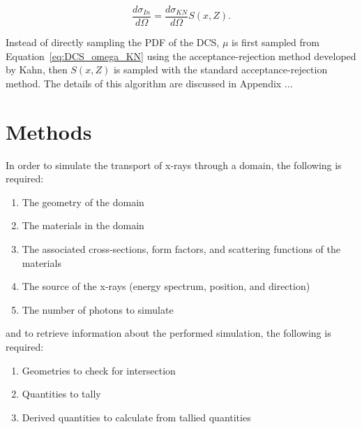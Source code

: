 \begin{equation}
    \frac{d\sigma_{In}}{d\Omega} = \frac{d\sigma_{KN}}{d\Omega} S(x, Z).
\end{equation}

\par Instead of directly sampling the PDF of the DCS, $\mu$ is first sampled from Equation~\ref{eq:DCS_omega_KN} using the acceptance-rejection method developed by Kahn, then $S(x, Z)$ is sampled with the standard acceptance-rejection method. The details of this algorithm are discussed in Appendix ...

\section{Methods}

In order to simulate the transport of x-rays through a domain, the following is required:

\begin{enumerate}
    \item The geometry of the domain
    \item The materials in the domain
    \item The associated cross-sections, form factors, and scattering functions of the materials
    \item The source of the x-rays (energy spectrum, position, and direction)
    \item The number of photons to simulate
\end{enumerate}

and to retrieve information about the performed simulation, the following is required:

\begin{enumerate}
    \item Geometries to check for intersection
    \item Quantities to tally
    \item Derived quantities to calculate from tallied quantities
\end{enumerate}

